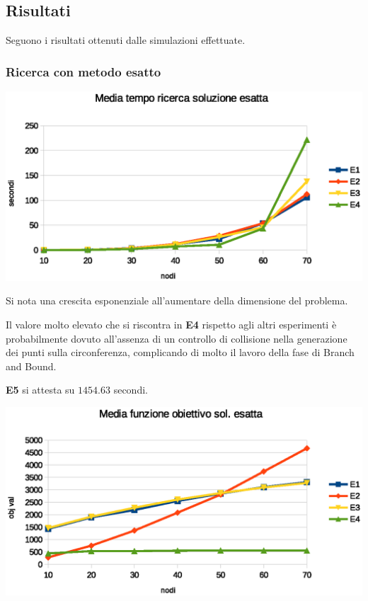 \documentclass[a4paper]{article}
\begin{document}
        \subsection{Risultati}
            Seguono i risultati ottenuti dalle simulazioni effettuate.
            \subsubsection{Ricerca con metodo esatto}

                \includegraphics[scale=0.7]{img/exavgtime}

                Si nota una crescita esponenziale all'aumentare della dimensione del problema.

                Il valore molto elevato che si riscontra in \textbf{E4} rispetto agli altri esperimenti \`e probabilmente dovuto all'assenza di un controllo di collisione
                nella generazione dei punti sulla circonferenza, complicando di molto il lavoro della fase di Branch and Bound.

                \textbf{E5} si attesta su $1454.63$ secondi.

                \includegraphics[scale=0.7]{img/exavgobj}
\end{document}
